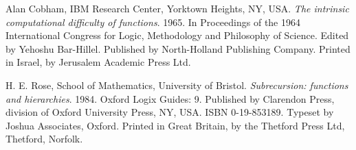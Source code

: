 \begin{thebibliography}{9} %


Alan Cobham, IBM Research Center, Yorktown Heights, NY, USA. \emph{The
intrinsic computational difficulty of functions}. 1965. In Proceedings of the
1964 International Congress for Logic, Methodology and Philosophy of Science.
Edited by Yehoshu Bar-Hillel. Published by North-Holland Publishing Company.
Printed in Israel, by Jerusalem Academic Press Ltd.


H. E. Rose, School of Mathematics, University of Bristol. \emph{Subrecursion:
functions and hierarchies}. 1984. Oxford Logix Guides: 9. Published by
Clarendon Press, division of Oxford University Press, NY, USA. ISBN
0-19-853189. Typeset by Joshua Associates, Oxford.  Printed in Great Britain,
by the Thetford Press Ltd, Thetford, Norfolk.

\end{thebibliography}
